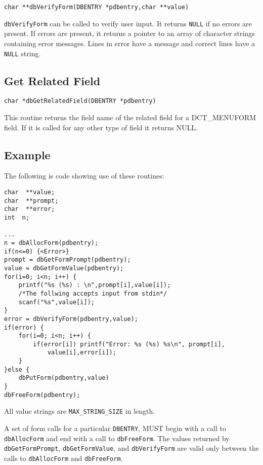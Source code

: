 \begin{verbatim}
char **dbVerifyForm(DBENTRY *pdbentry,char **value)
\end{verbatim}

\verb|dbVerifyForm| can be called to verify user input. It returns \verb|NULL| if no errors are present. If errors are present, it returns 
a pointer to an array of character strings containing error messages. Lines in error have a message and correct lines have a 
\verb|NULL| string.

\subsection{Get Related Field}

\begin{verbatim}
char *dbGetRelatedField(DBENTRY *pdbentry)
\end{verbatim}

This routine returns the field name of the related field for a DCT\_MENUFORM field. If it is called for any other type of 
field it returns NULL.

\subsection{Example}

The following is code showing use of these routines:

\begin{verbatim}
char  **value;
char  **prompt;
char  **error;
int  n;

...
n = dbAllocForm(pdbentry);
if(n<=0) {<Error>}
prompt = dbGetFormPrompt(pdbentry);
value = dbGetFormValue(pdbentry);
for(i=0; i<n; i++) {
    printf("%s (%s) : \n",prompt[i],value[i]);
    /*The follwing accepts input from stdin*/
    scanf("%s",value[i]);
}
error = dbVerifyForm(pdbentry,value);
if(error) {
    for(i=0; i<n; i++) {
        if(error[i]) printf("Error: %s (%s) %s\n", prompt[i],
            value[i],error[i]);
    }
}else {
    dbPutForm(pdbentry,value)
}
dbFreeForm(pdbentry);
\end{verbatim}

All value strings are \verb|MAX_STRING_SIZE| in length.

A set of form calls for a particular \verb|DBENTRY|, MUST begin with a call to \verb|dbAllocForm| and end with a call to 
\verb|dbFreeForm|. The values returned by \verb|dbGetFormPrompt|, \verb|dbGetFormValue|, and \verb|dbVerifyForm| are valid only 
between the calls to \verb|dbAllocForm| and \verb|dbFreeForm|.

